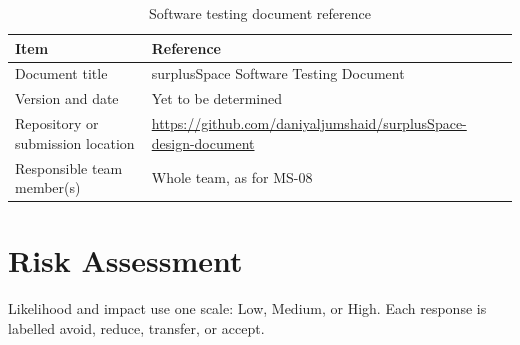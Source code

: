 \begin{table}[H]
\centering
\caption{Software testing document reference}
\label{tab:testing-reference}
\begin{tabularx}{\textwidth}{@{}>{\raggedright\arraybackslash}p{}>{\raggedright\arraybackslash}X@{}}
\toprule
\textbf{Item} & \textbf{Reference} \\
\midrule
Document title & surplusSpace Software Testing Document \\
Version and date & Yet to be determined \\
Repository or submission location & \url{https://github.com/daniyaljumshaid/surplusSpace-design-document} \\
Responsible team member(s) & Whole team, as for MS-08 \\
\bottomrule
\end{tabularx}
\end{table}

\section{Risk Assessment}
Likelihood and impact use one scale: Low, Medium, or High. Each response is labelled
avoid, reduce, transfer, or accept.

